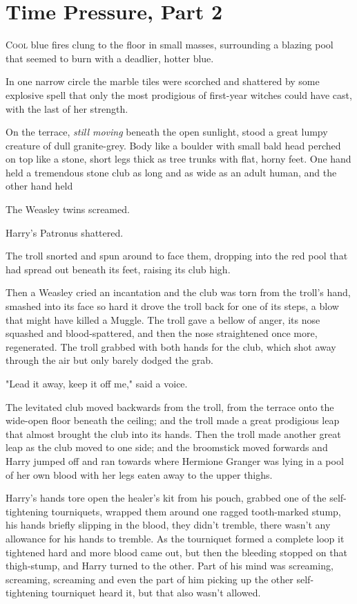 \chapter{Time Pressure, Part 2}

\lettrine{C}{ool} blue fires
clung to the floor in small masses, surrounding a blazing pool that seemed to
burn with a deadlier, hotter blue.

In one narrow circle the marble tiles were scorched and shattered by some
explosive spell that only the most prodigious of first-year witches could have
cast, with the last of her strength.

On the terrace, \emph{still moving} beneath the open sunlight, stood a great
lumpy creature of dull granite-grey. Body like a boulder with small bald head
perched on top like a stone, short legs thick as tree trunks with flat, horny
feet. One hand held a tremendous stone club as long and as wide as an adult
human, and the other hand held 

The Weasley twins screamed.

Harry's Patronus shattered.

The troll snorted and spun around to face them, dropping 
into the red pool that had spread out beneath its feet, raising its club high.

Then a Weasley cried an incantation and the club was torn from the troll's
hand, smashed into its face so hard it drove the troll back for one of its
steps, a blow that might have killed a Muggle. The troll gave a bellow of
anger, its nose squashed and blood-spattered, and then the nose straightened
once more, regenerated. The troll grabbed with both hands for the club, which
shot away through the air but only barely dodged the grab.

"Lead it away, keep it off me," said a voice.

The levitated club moved backwards from the troll, from the terrace onto the
wide-open floor beneath the ceiling; and the troll made a great prodigious leap
that almost brought the club into its hands. Then the troll made another great
leap as the club moved to one side; and the broomstick moved forwards and Harry
jumped off and ran towards where Hermione Granger was lying in a pool of her
own blood with her legs eaten away to the upper thighs.

Harry's hands tore open the healer's kit from his pouch, grabbed one of the
self-tightening tourniquets, wrapped them around one ragged tooth-marked stump,
his hands briefly slipping in the blood, they didn't tremble, there wasn't any
allowance for his hands to tremble. As the tourniquet formed a complete loop it
tightened hard and more blood came out, but then the bleeding stopped on that
thigh-stump, and Harry turned to the other. Part of his mind was screaming,
screaming, screaming and even the part of him picking up the other
self-tightening tourniquet heard it, but that also wasn't allowed.

